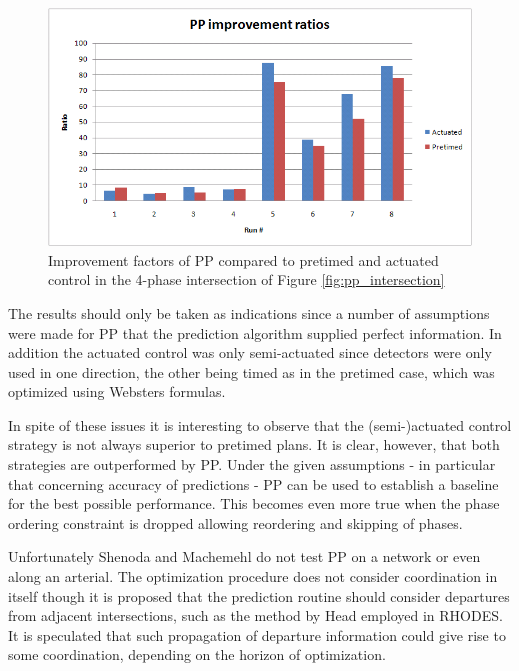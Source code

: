 \begin{figure}[!ht]
\begin{center}
\includegraphics[scale=0.5]{phase-by-phase_improvement_ratios.png} 
\end{center}
\caption{Improvement factors of PP compared to pretimed and actuated control in the 4-phase intersection of Figure \ref{fig:pp_intersection}}
\label{fig:pp_improvements}
\end{figure}

The results should only be taken as indications since a number of assumptions were made for PP that the prediction algorithm supplied perfect information. In addition the actuated control was only semi-actuated since detectors were only used in one direction, the other being timed as in the pretimed case, which was optimized using Websters formulas.

In spite of these issues it is interesting to observe that the (semi-)actuated control strategy is not always superior to pretimed plans. It is clear, however, that both strategies are outperformed by PP. Under the given assumptions - in particular that concerning accuracy of predictions - PP can be used to establish a baseline for the best possible performance. This becomes even more true when the phase ordering constraint is dropped allowing reordering and skipping of phases.

Unfortunately Shenoda and Machemehl do not test PP on a network or even along an arterial. The optimization procedure does not consider coordination in itself though it is proposed that the prediction routine should consider departures from adjacent intersections, such as the method by Head employed in RHODES. It is speculated that such propagation of departure information could give rise to some coordination, depending on the horizon of optimization.